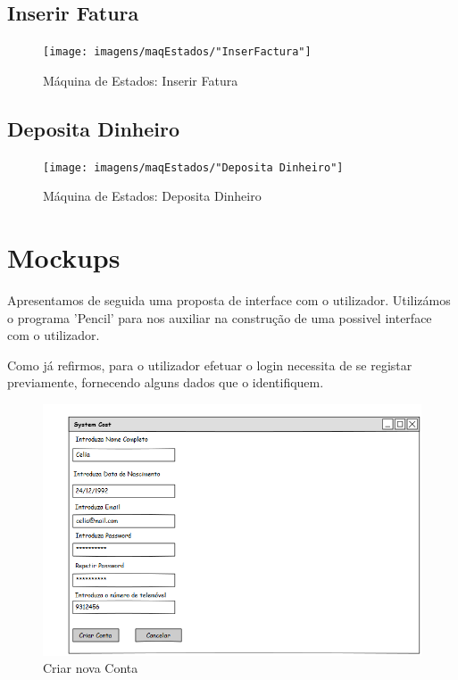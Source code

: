 \subsection{Inserir Fatura}
\begin{figure}[htb!]
	\centering
	\texttt{[image: imagens/maqEstados/"InserFactura"]}  
	\caption{Máquina de Estados: Inserir Fatura}  
\end{figure}

\subsection{Deposita Dinheiro}
\begin{figure}[htb!]
	\centering
	\texttt{[image: imagens/maqEstados/"Deposita Dinheiro"]}  
	\caption{Máquina de Estados: Deposita Dinheiro}  
\end{figure}

\newpage
\section{Mockups}
Apresentamos de seguida uma proposta de interface com o utilizador. Utilizámos o programa 'Pencil' para nos auxiliar na construção de uma possivel interface com o utilizador. 


Como já refirmos, para o utilizador efetuar o login necessita de se registar previamente, fornecendo alguns dados que o identifiquem. 
\begin{figure}[htb!]
	\centering
	\includegraphics[scale=0.5]{imagens/mockups/CriarConta}  
	\caption{Criar nova Conta }  
\end{figure}

